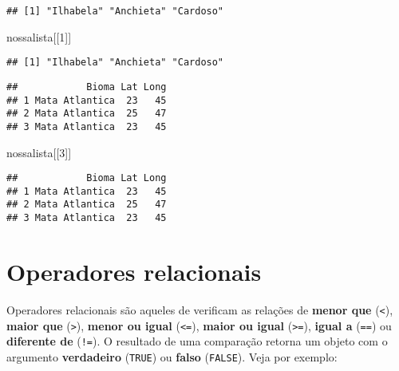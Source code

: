 \documentclass[
]{book}
\newenvironment{Shaded}{\begin{snugshade}}{\end{snugshade}}
\newcommand{\DecValTok}[1]{\textcolor[rgb]{0.00,0.00,0.81}{#1}}
\newcommand{\NormalTok}[1]{#1}
\newcommand{\SpecialCharTok}[1]{\textcolor[rgb]{0.00,0.00,0.00}{#1}}
\begin{document}
\begin{verbatim}
## [1] "Ilhabela" "Anchieta" "Cardoso"
\end{verbatim}

\begin{Shaded}
\begin{Highlighting}[]
\NormalTok{nossalista[[}\DecValTok{1}\NormalTok{]]}
\end{Highlighting}
\end{Shaded}

\begin{verbatim}
## [1] "Ilhabela" "Anchieta" "Cardoso"
\end{verbatim}

\begin{Shaded}
\end{Shaded}

\begin{verbatim}
##            Bioma Lat Long
## 1 Mata Atlantica  23   45
## 2 Mata Atlantica  25   47
## 3 Mata Atlantica  23   45
\end{verbatim}

\begin{Shaded}
\begin{Highlighting}[]
\NormalTok{nossalista[[}\DecValTok{3}\NormalTok{]]}
\end{Highlighting}
\end{Shaded}

\begin{verbatim}
##            Bioma Lat Long
## 1 Mata Atlantica  23   45
## 2 Mata Atlantica  25   47
## 3 Mata Atlantica  23   45
\end{verbatim}

\hypertarget{operadores-relacionais}{%
\section{Operadores relacionais}\label{operadores-relacionais}}

Operadores relacionais são aqueles de verificam as relações de \textbf{menor que} (\texttt{\textless{}}), \textbf{maior que} (\texttt{\textgreater{}}), \textbf{menor ou igual} (\texttt{\textless{}=}), \textbf{maior ou igual} (\texttt{\textgreater{}=}), \textbf{igual a} (\texttt{==}) ou \textbf{diferente de} (\texttt{!=}). O resultado de uma comparação retorna um objeto com o argumento \textbf{verdadeiro} (\texttt{TRUE}) ou \textbf{falso} (\texttt{FALSE}). Veja por exemplo:
\end{document}
